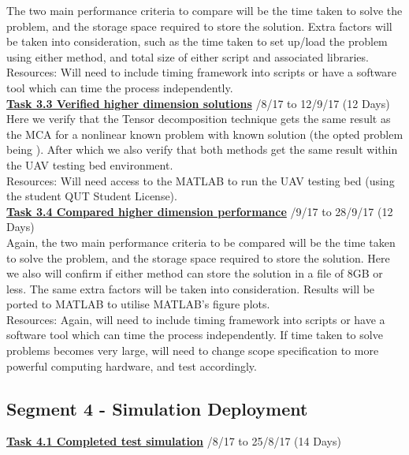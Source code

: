 \documentclass[11pt,draftd]{article}
\begin{document}
\begin{appendices}
	\noindent The two main performance criteria to compare will be the time taken to solve the problem, and the storage space required to store the solution. Extra factors will be taken into consideration, such as the time taken to set up/load the problem using either method, and total size of either script and associated libraries. \\
	Resources: Will need to include timing framework into scripts or have a software tool which can time the process independently.\\
	
	\noindent\underline{\textbf{Task 3.3 Verified higher dimension solutions}} /8/17 to 12/9/17 (12 Days) \\
	
	\noindent Here we verify that the Tensor decomposition technique gets the same result as the MCA for a nonlinear known problem with known solution (the opted problem being \cite{zylong}). After which we also verify that both methods get the same result within the UAV testing bed environment. \\
	Resources: Will need access to the MATLAB to run the UAV testing bed (using the student QUT Student License).\\
	
	\noindent\underline{\textbf{Task 3.4 Compared higher dimension performance}} /9/17 to 28/9/17 (12 Days) \\
	
	\noindent Again, the two main performance criteria to be compared will be the time taken to solve the problem, and the storage space required to store the solution. Here we also will confirm if either method can store the solution in a file of 8GB or less. The same extra factors will be taken into consideration. Results will be ported to MATLAB to utilise MATLAB’s figure plots. \\
	Resources: Again, will need to include timing framework into scripts or have a software tool which can time the process independently. If time taken to solve problems becomes very large, will need to change scope specification to more powerful computing hardware, and test accordingly.
	
	\subsection{Segment 4 - Simulation Deployment}
	\underline{\textbf{Task 4.1 Completed test simulation}} /8/17 to 25/8/17 (14 Days) \\
	

\end{appendices}
\end{document}
